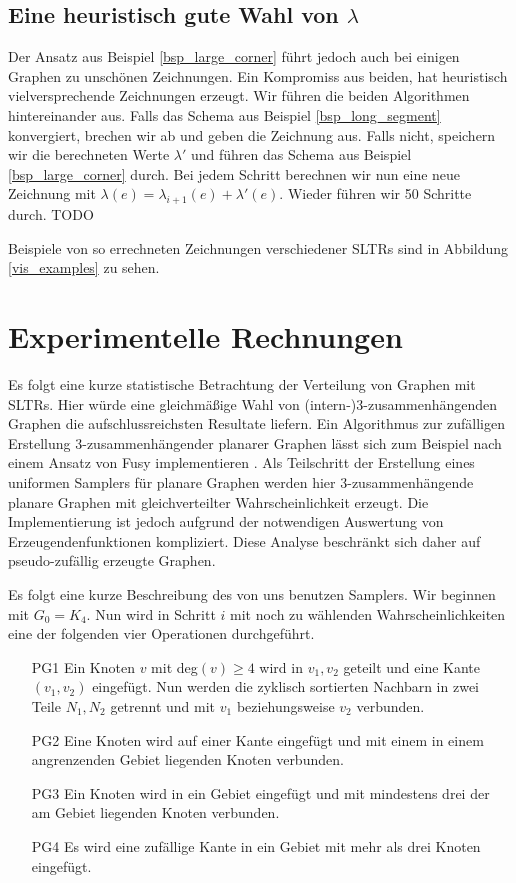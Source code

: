 \subsection{Eine heuristisch gute Wahl von $\lambda$}

Der Ansatz aus Beispiel \ref{bsp_large_corner} führt jedoch auch bei einigen Graphen zu unschönen Zeichnungen. Ein Kompromiss aus beiden, hat heuristisch vielversprechende Zeichnungen erzeugt. Wir führen die beiden Algorithmen hintereinander aus. Falls das Schema aus Beispiel \ref{bsp_long_segment} konvergiert, brechen wir ab und geben die Zeichnung aus. Falls nicht, speichern wir die berechneten Werte $\lambda'$ und führen das Schema aus Beispiel \ref{bsp_large_corner} durch. Bei jedem Schritt berechnen wir nun eine neue Zeichnung mit $\lambda(e) = \lambda_{i+1}(e) + \lambda'(e)$. Wieder führen wir 50 Schritte durch.  TODO

Beispiele von so errechneten Zeichnungen verschiedener SLTRs sind in Abbildung \ref{vis_examples} zu sehen.

\section{Experimentelle Rechnungen}\label{stats}

Es folgt eine kurze statistische Betrachtung der Verteilung von Graphen mit SLTRs. Hier würde eine gleichmäßige Wahl von (intern-)3-zusammenhängenden Graphen die aufschlussreichsten Resultate liefern. Ein Algorithmus zur zufälligen Erstellung 3-zusammenhängender planarer Graphen lässt sich zum Beispiel nach einem Ansatz von Fusy implementieren \cite{fusy09}. Als Teilschritt der Erstellung eines uniformen Samplers für planare Graphen werden hier 3-zusammenhängende planare Graphen mit gleichverteilter Wahrscheinlichkeit erzeugt. Die Implementierung ist jedoch aufgrund der notwendigen Auswertung von Erzeugendenfunktionen kompliziert. Diese Analyse beschränkt sich daher auf pseudo-zufällig erzeugte Graphen. 

Es folgt eine kurze Beschreibung des von uns benutzen Samplers. Wir beginnen mit $G_0 = K_4$. Nun wird in Schritt $i$ mit noch zu wählenden Wahrscheinlichkeiten eine der folgenden vier Operationen durchgeführt.

\begin{itemize}
\item[PG1] Ein Knoten $v$ mit deg$(v) \geq 4$ wird in $v_1,v_2$ geteilt und eine Kante $(v_1,v_2)$ eingefügt. Nun werden die zyklisch sortierten Nachbarn in zwei Teile $N_1,N_2$ getrennt und mit $v_1$ beziehungsweise $v_2$ verbunden.
\item[PG2] Eine Knoten wird auf einer Kante eingefügt und mit einem in einem angrenzenden Gebiet liegenden Knoten verbunden.
\item[PG3] Ein Knoten wird in ein Gebiet eingefügt und mit mindestens drei der am Gebiet liegenden Knoten verbunden. 
\item[PG4] Es wird eine zufällige Kante in ein Gebiet mit mehr als drei Knoten eingefügt.
\end{itemize}

